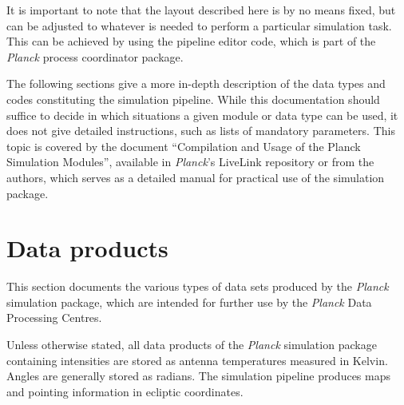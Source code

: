 \documentclass{aa}
\begin{document}
It is important to note that the layout described here is by no means
fixed, but can be adjusted to whatever is needed to perform a
particular simulation task. This can be achieved by using the pipeline
editor code, which is part of the \emph{Planck} process coordinator
package.

The following sections give a more in-depth description of the data types
and codes constituting the simulation pipeline.
While this documentation should suffice to decide in which situations a
given module or data type can be used, it does not give detailed
instructions, such as lists of mandatory parameters. This topic is
covered by the document ``Compilation and Usage of the Planck Simulation
Modules'', available in \emph{Planck}'s LiveLink repository or from
the authors, which serves as a detailed manual for practical use of
the simulation package.

\section {Data products}
\label{datatypes}

This section documents the various types of data sets produced by the
\emph{Planck} simulation package, which are intended for further use by
the \emph{Planck} Data Processing Centres.

Unless otherwise stated, all data products of the \emph{Planck}
simulation package containing intensities are stored as antenna
temperatures measured in Kelvin. Angles are generally stored as
radians. The simulation pipeline produces maps and pointing information
in ecliptic coordinates.
\end{document}
